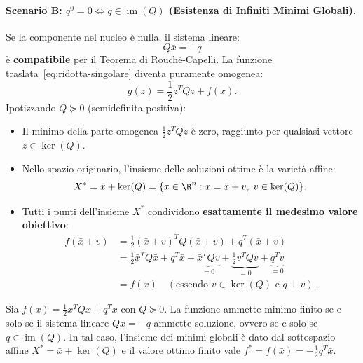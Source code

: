 \paragraph{Scenario B: $q^0 = 0 \iff q \in \operatorname{im}(Q)$ (Esistenza di Infiniti Minimi Globali).}
Se la componente nel nucleo \`e nulla, il sistema lineare:
\begin{equation}
    Q \bar{x} = -q
\end{equation}
\`e \textbf{compatibile} per il Teorema di Rouch\'e-Capelli. La funzione traslata~\eqref{eq:ridotta-singolare} diventa puramente omogenea:
\begin{equation}
    g(z) = \frac{1}{2} z^T Q z + f(\bar{x}).
\end{equation}
Ipotizzando $Q \succeq 0$ (semidefinita positiva):
\begin{itemize}
    \item Il minimo della parte omogenea $\frac{1}{2} z^T Q z$ \`e zero, raggiunto per qualsiasi vettore $z \in \ker(Q)$.
    \item Nello spazio originario, l'insieme delle soluzioni ottime \`e la variet\`a affine:
    \begin{equation}
        X^* = \bar{x} + \ker(Q) = \{x \in \R^n : x = \bar{x} + v, \; v \in \ker(Q)\}.
    \end{equation}
    \item Tutti i punti dell'insieme $X^*$ condividono \textbf{esattamente il medesimo valore obiettivo}:
    \begin{align}
        f(\bar{x} + v) &= \frac{1}{2} (\bar{x} + v)^T Q (\bar{x} + v) + q^T (\bar{x} + v) \nonumber \\
        &= \frac{1}{2} \bar{x}^T Q \bar{x} + q^T \bar{x} + \underbrace{\bar{x}^T Q v}_{= 0} + \underbrace{\frac{1}{2} v^T Q v}_{= 0} + \underbrace{q^T v}_{= 0} \nonumber \\
        &= f(\bar{x}) \quad (\text{essendo } v \in \ker(Q) \text{ e } q \perp v).
    \end{align}
\end{itemize}

\begin{theorem}
\label{thm:esistenza-minimo-quadratica}
Sia $f(x) = \frac{1}{2} x^T Q x + q^T x$ con $Q \succeq 0$. La funzione ammette minimo finito se e solo se il sistema lineare $Qx = -q$ ammette soluzione, ovvero se e solo se $q \in \operatorname{im}(Q)$.
In tal caso, l'insieme dei minimi globali \`e dato dal sottospazio affine $X^* = \bar{x} + \ker(Q)$ e il valore ottimo finito vale $f^* = f(\bar{x}) = -\frac{1}{2} q^T \bar{x}$.
\end{theorem}


